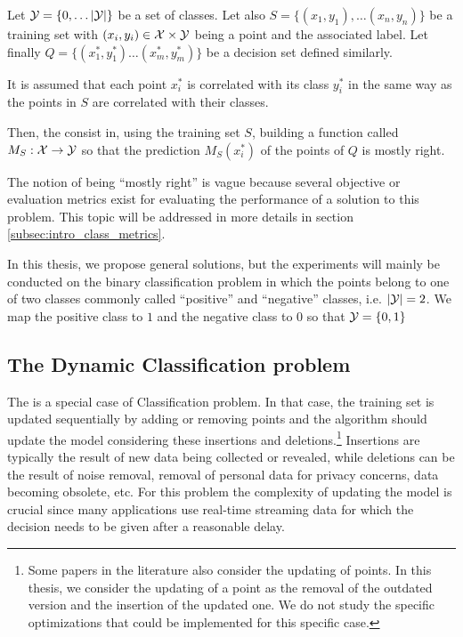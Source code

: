 \begin{definition} 
    Let $\mathcal{Y} = \{0, \dots |\mathcal{Y}|\}$ be a set of classes. Let also $S = \{(x_1, y_1), \dots (x_n, y_n)\}$ be a training set with $(x_i, y_i) \in \mathcal{X} \times \mathcal{Y}$ being a point and the associated label. Let finally $Q = \{(x^*_1, y^*_1) \dots (x^*_m, y^*_m)\}$ be a decision set defined similarly.
    
    It is assumed that each point $x^*_i$ is correlated with its class $y^*_i$ in the same way as the points in $S$ are correlated with their classes.

    Then, the  consist in, using the training set $S$, building a function called  $M_S : \mathcal{X} \rightarrow \mathcal{Y}$ so that the prediction $M_S(x^*_i)$ of the points of $Q$ is mostly right.
\end{definition}

The notion of being “mostly right” is vague because several objective or evaluation metrics exist for evaluating the performance of a solution to this problem. This topic will be addressed in more details in section \ref{subsec:intro_class_metrics}.

In this thesis, we propose general solutions, but the experiments will mainly be conducted on the binary classification problem in which the points belong to one of two classes commonly called “positive” and “negative” classes, i.e. $|\mathcal{Y}| = 2$. We map the positive class to $1$ and the negative class to $0$ so that $\mathcal{Y} =  \{0, 1\}$ 

\subsection{The Dynamic Classification problem}\label{subsec:dynamic_intro}
The  is a special case of Classification problem. In that case, the training set is updated sequentially by adding or removing points and the algorithm should update the model considering these insertions and deletions.\footnote{Some papers in the literature also consider the updating of points. In this thesis, we consider the updating of a point as the removal of the outdated version and the insertion of the updated one. We do not study the specific optimizations that could be implemented for this specific case.} Insertions are typically the result of new data being collected or revealed, while deletions can be the result of noise removal, removal of personal data for privacy concerns,  data becoming obsolete, etc. For this problem the complexity of updating the model is crucial since many applications use real-time streaming data for which the decision needs to be given after a reasonable delay.


